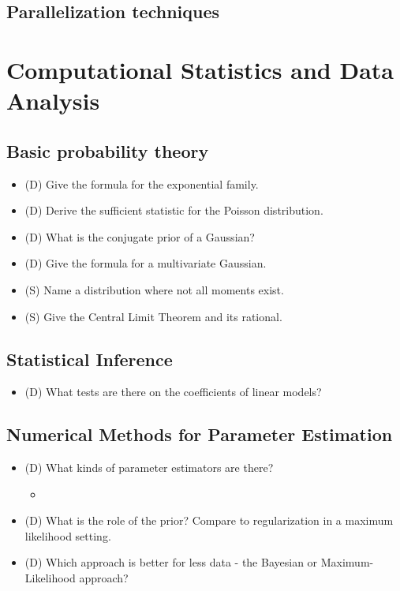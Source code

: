 \subsection*{Parallelization techniques}

\section{Computational Statistics and Data Analysis}

\subsection*{Basic probability theory}

\begin{itemize}
    \item (D) Give the formula for the exponential family.
    \item (D) Derive the sufficient statistic for the Poisson distribution.
    \item (D) What is the conjugate prior of a Gaussian?
    \item (D) Give the formula for a multivariate Gaussian.
    \item (S) Name a distribution where not all moments exist.
    \item (S) Give the Central Limit Theorem and its rational.
\end{itemize}

\subsection*{Statistical Inference}

\begin{itemize}
    \item (D) What tests are there on the coefficients of linear models?
\end{itemize}

\subsection*{Numerical Methods for Parameter Estimation}

\begin{itemize}
    \item (D) What kinds of parameter estimators are there?
    \begin{itemize}
        \item {}
    \end{itemize}
    \item (D) What is the role of the prior? Compare to regularization in a maximum likelihood setting.
    \item (D) Which approach is better for less data - the Bayesian or Maximum-Likelihood approach?
\end{itemize}


